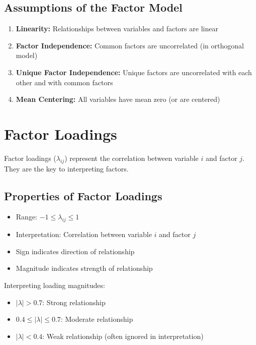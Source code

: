 \documentclass[a4paper]{tufte-book}
\begin{document}
\subsection{Assumptions of the Factor Model}

\begin{enumerate}
\item \textbf{Linearity:} Relationships between variables and factors are linear
\item \textbf{Factor Independence:} Common factors are uncorrelated (in orthogonal model)
\item \textbf{Unique Factor Independence:} Unique factors are uncorrelated with each other and with common factors
\item \textbf{Mean Centering:} All variables have mean zero (or are centered)
\end{enumerate}

\section{Factor Loadings}

Factor loadings ($\lambda_{ij}$) represent the correlation between variable $i$ and factor $j$. They are the key to interpreting factors.

\subsection{Properties of Factor Loadings}

\begin{itemize}
\item Range: $-1 \leq \lambda_{ij} \leq 1$
\item Interpretation: Correlation between variable $i$ and factor $j$
\item Sign indicates direction of relationship
\item Magnitude indicates strength of relationship
\end{itemize}

\begin{learningtip}
Interpreting loading magnitudes:
\begin{itemize}
\item $|\lambda| > 0.7$: Strong relationship
\item $0.4 \leq |\lambda| \leq 0.7$: Moderate relationship
\item $|\lambda| < 0.4$: Weak relationship (often ignored in interpretation)
\end{itemize}
\end{learningtip}
\end{document}
